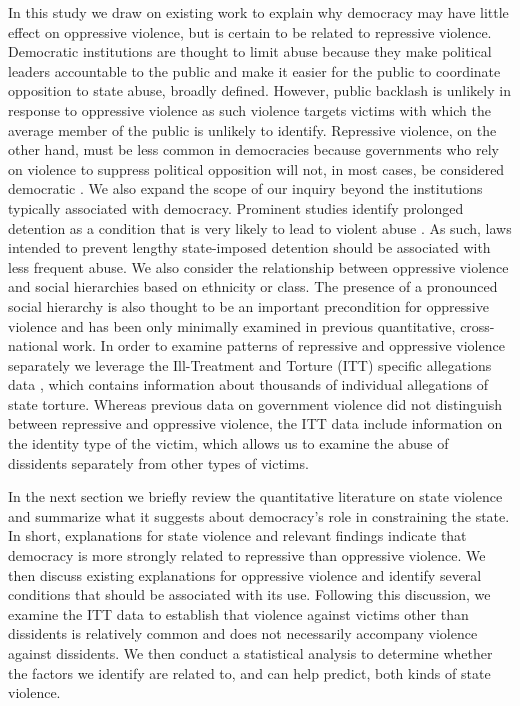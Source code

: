 \documentclass[11pt]{article}
\begin{document}
In this study we draw on existing work to explain why democracy may have little effect on oppressive violence, but is certain to be related to repressive violence. Democratic institutions are thought to limit abuse because they make political leaders accountable to the public and make it easier for the public to coordinate opposition to state abuse, broadly defined. However, public backlash is unlikely in response to oppressive violence as such violence targets victims with which the average member of the public is unlikely to identify. Repressive violence, on the other hand, must be less common in democracies because governments who rely on violence to suppress political opposition will not, in most cases, be considered democratic \citep{Hill2016}. We also expand the scope of our inquiry beyond the institutions typically associated with democracy. Prominent studies identify prolonged detention as a condition that is very likely to lead to violent abuse \citep{Rejali2007,ConradMoore2010}. As such, laws intended to prevent lengthy state-imposed detention should be associated with less frequent abuse. We also consider the relationship between oppressive violence and social hierarchies based on ethnicity or class. The presence of a pronounced social hierarchy is also thought to be an important precondition for oppressive violence \citep{Rejali2007} and has been only minimally examined in previous quantitative, cross-national work. In order to examine patterns of repressive and oppressive violence separately we leverage the Ill-Treatment and Torture (ITT) specific allegations data \citep{ConradHaglundMoore2014}, which contains information about thousands of individual allegations of state torture. Whereas previous data on government violence did not distinguish between repressive and oppressive violence, the ITT data include information on the identity type of the victim, which allows us to examine the abuse of dissidents separately from other types of victims. 

In the next section we briefly review the quantitative literature on state violence and summarize what it suggests about democracy's role in constraining the state. In short, explanations for state violence and relevant findings indicate that democracy is more strongly related to repressive than oppressive violence. We then discuss existing explanations for oppressive violence and identify several conditions that should be associated with its use. Following this discussion, we examine the ITT data to establish that violence against victims other than dissidents is relatively common and does not necessarily accompany violence against dissidents. We then conduct a statistical analysis to determine whether the factors we identify are related to, and can help predict, both kinds of state violence.  
\end{document}
